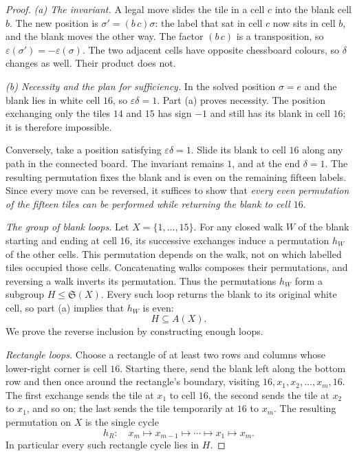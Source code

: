 \begin{proof}
\emph{(a) The invariant.}
A legal move slides the tile in a cell $c$ into the blank cell $b$. The new position is $\sigma'=(b\,c)\sigma$: the label that sat in cell $c$ now sits in cell $b$, and the blank moves the other way. The factor $(b\,c)$ is a transposition, so $\varepsilon(\sigma')=-\varepsilon(\sigma)$. The two adjacent cells have opposite chessboard colours, so $\delta$ changes as well. Their product does not.

\emph{(b) Necessity and the plan for sufficiency.}
In the solved position $\sigma=e$ and the blank lies
in white cell $16$, so $\varepsilon\delta=1$.
Part (a) proves necessity. The position exchanging
only the tiles $14$ and $15$ has sign $-1$ and still
has its blank in cell $16$; it is therefore impossible.

Conversely, take a position satisfying
$\varepsilon\delta=1$. Slide its blank to cell $16$
along any path in the connected board. The invariant
remains $1$, and at the end $\delta=1$.
The resulting permutation fixes the blank and
is even on the remaining fifteen labels.
Since every move can be reversed, it suffices to
show that \emph{every even permutation of the
fifteen tiles can be performed while returning
the blank to cell $16$}.

\emph{The group of blank loops.}
Let $X=\{1,\ldots,15\}$.
For any closed walk $W$ of the blank starting
and ending at cell $16$, its successive exchanges
induce a permutation $h_W$ of the other cells.
This permutation depends on the walk, not on
which labelled tiles occupied those cells.
Concatenating walks composes their permutations,
and reversing a walk inverts its permutation.
Thus the permutations $h_W$ form a subgroup
$H\le\mathfrak S(X)$. Every such loop returns
the blank to its original white cell, so part (a)
implies that $h_W$ is even:
\[
H\subseteq A(X).
\]
We prove the reverse inclusion by constructing
enough loops.

\emph{Rectangle loops.}
Choose a rectangle of at least two rows and columns
whose lower-right corner is cell $16$. Starting
there, send the blank left along the bottom row
and then once around the rectangle's boundary,
visiting
$16,x_1,x_2,\ldots,x_m,16$.
The first exchange sends the tile at $x_1$ to
cell $16$, the second sends the tile at $x_2$
to $x_1$, and so on; the last sends the tile
temporarily at $16$ to $x_m$. The resulting
permutation on $X$ is the single cycle
\[
h_R:\quad x_m\longmapsto x_{m-1}
\longmapsto\cdots\longmapsto x_1
\longmapsto x_m.
\]
In particular every such rectangle cycle lies in $H$.


\end{proof}
